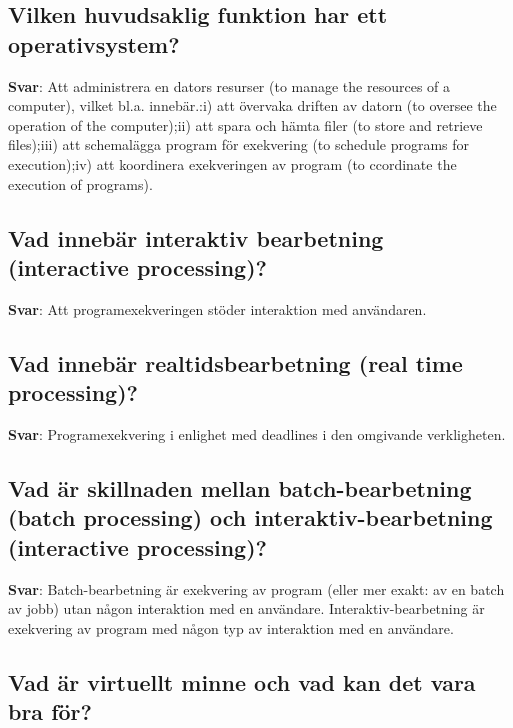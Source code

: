 \documentclass[a4paper,11pt,oneside]{article}
\begin{document}
\begin{sloppypar}
\subsection{Vilken huvudsaklig funktion har ett operativsystem?}

\label{q:109:sa:sv:True}

\textbf{Svar}: Att administrera en dators resurser (to manage the resources of a computer), vilket bl.a. inneb\"ar.:i) att \"overvaka driften av datorn (to oversee the operation of the computer);ii) att spara och h\"amta filer (to store and retrieve files);iii) att schemal\"agga program f\"or exekvering (to schedule programs for execution);iv) att koordinera exekveringen av program (to ccordinate the execution of programs).



\subsection{Vad inneb\"ar interaktiv bearbetning (interactive processing)?}

\label{q:110:sa:sv:True}

\textbf{Svar}: Att programexekveringen st\"oder interaktion med anv\"andaren.



\subsection{Vad inneb\"ar realtidsbearbetning (real time processing)?}

\label{q:111:sa:sv:True}

\textbf{Svar}: Programexekvering i enlighet med deadlines i den omgivande verkligheten.



\subsection{Vad \"ar skillnaden mellan batch-bearbetning (batch processing) och interaktiv-bearbetning (interactive processing)?}

\label{q:112:sa:sv:True}

\textbf{Svar}: Batch-bearbetning \"ar exekvering av program (eller mer exakt: av en batch av jobb) utan n\r{a}gon interaktion med en anv\"andare. Interaktiv-bearbetning \"ar exekvering av program med n\r{a}gon typ av interaktion med en anv\"andare.



\subsection{Vad \"ar virtuellt minne och vad kan det vara bra f\"or?}


\end{sloppypar}
\end{document}
